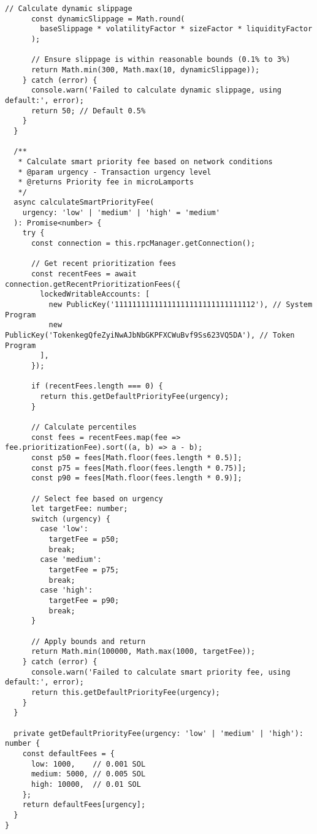 \documentclass[11pt,a4paper]{article}
\begin{document}
\begin{lstlisting}[style=typescript, caption=Advanced Trading Optimizations]
      // Calculate dynamic slippage
      const dynamicSlippage = Math.round(
        baseSlippage * volatilityFactor * sizeFactor * liquidityFactor
      );

      // Ensure slippage is within reasonable bounds (0.1% to 3%)
      return Math.min(300, Math.max(10, dynamicSlippage));
    } catch (error) {
      console.warn('Failed to calculate dynamic slippage, using default:', error);
      return 50; // Default 0.5%
    }
  }

  /**
   * Calculate smart priority fee based on network conditions
   * @param urgency - Transaction urgency level
   * @returns Priority fee in microLamports
   */
  async calculateSmartPriorityFee(
    urgency: 'low' | 'medium' | 'high' = 'medium'
  ): Promise<number> {
    try {
      const connection = this.rpcManager.getConnection();
      
      // Get recent prioritization fees
      const recentFees = await connection.getRecentPrioritizationFees({
        lockedWritableAccounts: [
          new PublicKey('11111111111111111111111111111112'), // System Program
          new PublicKey('TokenkegQfeZyiNwAJbNbGKPFXCWuBvf9Ss623VQ5DA'), // Token Program
        ],
      });

      if (recentFees.length === 0) {
        return this.getDefaultPriorityFee(urgency);
      }

      // Calculate percentiles
      const fees = recentFees.map(fee => fee.prioritizationFee).sort((a, b) => a - b);
      const p50 = fees[Math.floor(fees.length * 0.5)];
      const p75 = fees[Math.floor(fees.length * 0.75)];
      const p90 = fees[Math.floor(fees.length * 0.9)];

      // Select fee based on urgency
      let targetFee: number;
      switch (urgency) {
        case 'low':
          targetFee = p50;
          break;
        case 'medium':
          targetFee = p75;
          break;
        case 'high':
          targetFee = p90;
          break;
      }

      // Apply bounds and return
      return Math.min(100000, Math.max(1000, targetFee));
    } catch (error) {
      console.warn('Failed to calculate smart priority fee, using default:', error);
      return this.getDefaultPriorityFee(urgency);
    }
  }

  private getDefaultPriorityFee(urgency: 'low' | 'medium' | 'high'): number {
    const defaultFees = {
      low: 1000,    // 0.001 SOL
      medium: 5000, // 0.005 SOL  
      high: 10000,  // 0.01 SOL
    };
    return defaultFees[urgency];
  }
}
\end{lstlisting}
\end{document}
